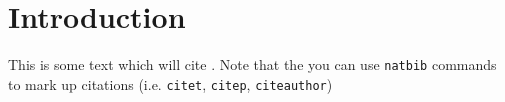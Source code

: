\graphicspath{{mainmatter/2/figures/}}


\chapter{Introduction}\label{chapt:introduction}


This is some text which will cite \citet{Einstein:1905:EBK}.
Note that the you can use \texttt{natbib} commands to mark up citations (i.e. \texttt{citet}, \texttt{citep}, \texttt{citeauthor})
